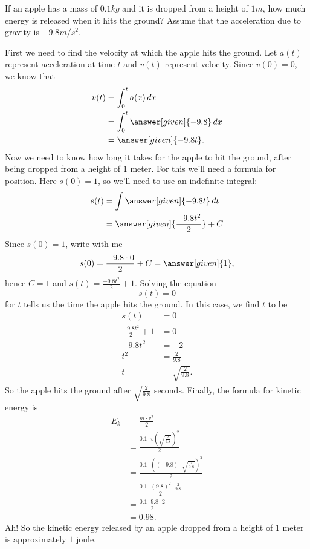 \documentclass{ximera}
\begin{document}
\begin{example}
  If an apple has a mass of $0.1\unit{kg}$ and it is dropped from a
  height of $1\unit{m}$, how much energy is released when it hits the
  ground? Assume that the acceleration due to gravity is
  $-9.8\unit{m}/\unit{s}^2$.
  \begin{explanation}
    First we need to find the velocity at which the apple hits the
    ground. Let $a(t)$ represent acceleration at time $t$ and $v(t)$
    represent velocity. Since $v(0) = 0$, we know that
    \begin{align*}
      v(t) &= \int_0^t a(x) \d x\\
      &= \int_0^t \answer[given]{-9.8} \d x \\
      &= \answer[given]{-9.8t}.
    \end{align*}
    Now we need to know how long it takes for the apple to hit the
    ground, after being dropped from a height of $1$ meter. For this
    we'll need a formula for position. Here $s(0) = 1$, so we'll need
    to use an indefinite integral:
    \begin{align*}
      s(t) &= \int \answer[given]{-9.8t} \d t \\
      &= \answer[given]{\frac{-9.8 t^2}{2}} + C
    \end{align*}
    Since $s(0)= 1$, write with me
    \[
    s(0) = \frac{-9.8 \cdot 0}{2} + C = \answer[given]{1},
    \]
    hence $C =1$ and $s(t) = \frac{-9.8 t^2}{2}+1$. Solving the equation
    \[
    s(t) = 0
    \]
    for $t$ tells us the time the apple hits the ground. In this case, we find $t$ to be
    \begin{align*}
      s(t) &= 0 \\
      \frac{-9.8 t^2}{2} +1 &= 0\\
      -9.8 t^2 &=-2\\
      t^2 &=\frac{2}{9.8}\\
      t &=\sqrt{\frac{2}{9.8}}.
    \end{align*}
    So the apple hits the ground after $\sqrt{\frac{2}{9.8}}$ seconds.
    Finally, the formula for kinetic energy is
    \begin{align*}
    E_k &= \frac{m \cdot v^2}{2} \\
    &= \frac{0.1 \cdot v\left(\sqrt{\frac{2}{9.8}}\right)^2}{2} \\
    &= \frac{0.1 \cdot \left((-9.8)\cdot \sqrt{\frac{2}{9.8}}\right)^2}{2} \\
    &= \frac{0.1 \cdot (9.8)^2\cdot\frac{2}{9.8}}{2} \\
    &= \frac{0.1 \cdot 9.8\cdot 2}{2} \\
    &= 0.98.
    \end{align*}
    Ah! So the kinetic energy released by an apple dropped from a
    height of $1$ meter is approximately $1$ joule.
  \end{explanation}
\end{example}
\end{document}
